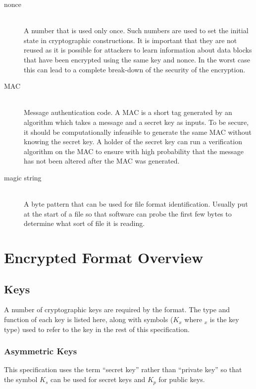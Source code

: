\documentclass[10pt]{article}
\begin{document}
\begin{description}
\item[nonce]~\\
A number that is used only once.
Such numbers are used to set the initial state in cryptographic constructions.
It is important that they are not reused as it is possible for attackers to learn information about data blocks that
have been encrypted using the same key and nonce.
In the worst case this can lead to a complete break-down of the security of the encryption.

\item[MAC]~\\
Message authentication code.
A MAC is a short tag generated by an algorithm which takes a message and a secret key as inputs.
To be secure, it should be computationally infeasible to generate the same MAC without knowing the secret key.
A holder of the secret key can run a verification algorithm on the MAC to ensure with high probability that the
message has not been altered after the MAC was generated.

\item[magic string]~\\
A byte pattern that can be used for file format identification.
Usually put at the start of a file so that software can probe the first few bytes to determine what sort of file
it is reading.

\end{description}

\section{Encrypted Format Overview}

\subsection{Keys}

A number of cryptographic keys are required by the format.
The type and function of each key is listed here,
along with symbols ($K_x$ where $_x$ is the key type) used to refer to the key in the rest of this specification.

\subsubsection{Asymmetric Keys}

This specification uses the term ``secret key'' rather than ``private key'' so that the symbol $K_s$ can be used
for secret keys and $K_p$ for public keys.
\end{document}
